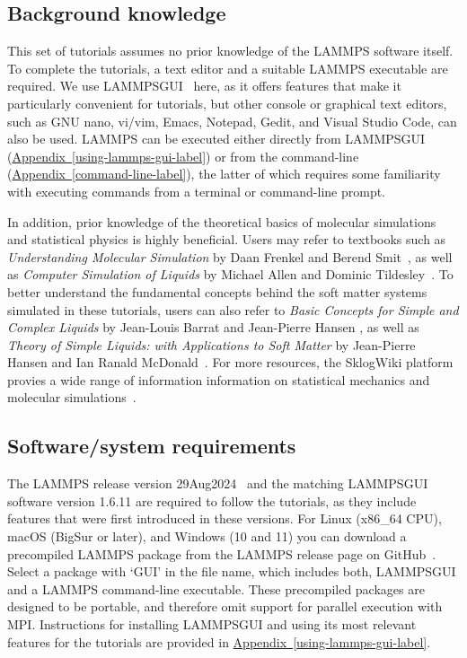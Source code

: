 \documentclass[9pt,tutorial]{livecoms}
\newcommand{\lammpsgui}{\textsf{LAMMPS\textendash GUI}}
\begin{document}
\subsection{Background knowledge}

This set of tutorials assumes no prior knowledge of the LAMMPS software
itself.  To complete the tutorials, a text editor and a suitable LAMMPS
executable are required.  We use \lammpsgui{}~\cite{lammps_gui_docs}
here, as it offers features that make it particularly convenient for
tutorials, but other console or graphical text editors, such as GNU nano,
vi/vim, Emacs, Notepad, Gedit, and Visual Studio Code, can also be
used.  LAMMPS can be executed either directly from
\lammpsgui{} (\hyperref[using-lammps-gui-label]{Appendix~\ref{using-lammps-gui-label}})
or from the command-line (\hyperref[command-line-label]{Appendix~\ref{command-line-label}}),
the latter of which requires some familiarity with executing commands
from a terminal or command-line prompt.

In addition, prior knowledge of the theoretical basics of molecular
simulations and statistical physics is highly beneficial.  Users may
refer to textbooks such as \textit{Understanding Molecular Simulation} by
Daan Frenkel and Berend Smit~\cite{frenkel2023understanding}, as well as
\textit{Computer Simulation of Liquids} by Michael Allen and Dominic
Tildesley~\cite{allen2017computer}.  To better understand
the fundamental concepts behind the soft matter systems simulated in these
tutorials, users can also refer to \textit{Basic Concepts for Simple and
  Complex Liquids} by Jean-Louis Barrat and Jean-Pierre Hansen
\cite{barrat2003basic}, as well as \textit{Theory of Simple Liquids:
  with Applications to Soft Matter} by Jean-Pierre Hansen and Ian Ranald
McDonald~\cite{hansen2013theory}.  For more resources, the SklogWiki
platform provies a wide range of information information on statistical mechanics
and molecular simulations~\cite{sklogwiki_main_page}. 

\subsection{Software/system requirements}

The LAMMPS release version 29Aug2024~\cite{lammps_code} and the matching
\lammpsgui{} software version 1.6.11 are required to follow the
tutorials, as they include features that were first introduced in these
versions.  For Linux (x86\_64 CPU), macOS (BigSur or later), and Windows
(10 and 11) you can download a precompiled LAMMPS package from the
LAMMPS release page on GitHub~\cite{lammps_github_release}.
Select a package with `GUI' in the file name, which includes both,
\lammpsgui{} and a LAMMPS command-line executable.  These precompiled
packages are designed to be portable, and therefore omit support for
parallel execution with MPI.  Instructions for installing \lammpsgui{}
and using its most relevant features for the tutorials are provided in
\hyperref[using-lammps-gui-label]{Appendix~\ref{using-lammps-gui-label}}.
\end{document}

